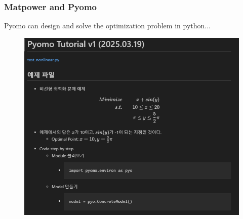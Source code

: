 \documentclass[
	11pt, %
	aspectratio=169, %
]{beamer}
\begin{document}

\begin{frame}
	\frametitle{Matpower and Pyomo}
	Pyomo can design and solve the optimization problem in python...

	\begin{figure}
		\includegraphics[width=3 in,keepaspectratio]{pyomo.png}
	\end{figure}

\end{frame}

\end{document}
